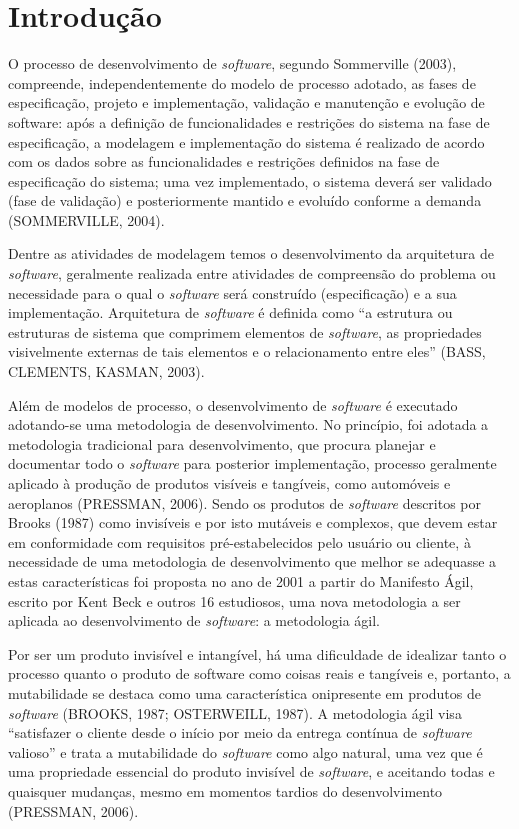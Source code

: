 \chapter[Introdução]{Introdução}

O processo de desenvolvimento de \textit{software}, segundo Sommerville (2003), compreende, independentemente do modelo de processo adotado, as fases de especificação, projeto e implementação, validação e manutenção e evolução de software: após a definição de funcionalidades e restrições do sistema na fase de especificação, a modelagem e implementação do sistema é realizado de acordo com os dados sobre as funcionalidades e restrições definidos na fase de especificação do sistema; uma vez implementado, o sistema deverá ser validado (fase de validação) e posteriormente mantido e evoluído conforme a demanda (SOMMERVILLE, 2004). 

Dentre as atividades de modelagem temos o desenvolvimento da arquitetura de \textit{software}, geralmente realizada entre atividades de compreensão do problema ou necessidade para o qual o \textit{software} será construído (especificação) e a sua implementação. Arquitetura de \textit{software} é definida como “a estrutura ou estruturas de sistema que comprimem elementos de \textit{software}, as propriedades visivelmente externas de tais elementos e o relacionamento entre eles” (BASS, CLEMENTS, KASMAN, 2003).

Além de modelos de processo, o desenvolvimento de \textit{software} é executado adotando-se uma metodologia de desenvolvimento. No princípio, foi adotada a metodologia tradicional para desenvolvimento, que procura planejar e documentar todo o \textit{software} para posterior implementação, processo geralmente aplicado à produção de produtos visíveis e tangíveis, como automóveis e aeroplanos (PRESSMAN, 2006). Sendo os produtos de \textit{software} descritos por Brooks (1987) como invisíveis e por isto mutáveis e complexos, que devem estar em conformidade com requisitos pré-estabelecidos pelo usuário ou cliente, à necessidade de uma metodologia de desenvolvimento que melhor se adequasse a estas características foi proposta no ano de 2001 a partir do Manifesto Ágil, escrito por Kent Beck e outros 16 estudiosos, uma nova metodologia a ser aplicada ao desenvolvimento de \textit{software}: a metodologia ágil.

Por ser um produto invisível e intangível, há uma dificuldade de idealizar tanto o processo quanto o produto de software como coisas reais e tangíveis e, portanto, a mutabilidade se destaca como uma característica onipresente em produtos de \textit{software} (BROOKS, 1987; OSTERWEILL, 1987). A metodologia ágil visa “satisfazer o cliente desde o início por meio da entrega contínua de \textit{software} valioso” e trata a mutabilidade do \textit{software} como algo natural, uma vez que é uma propriedade essencial do produto invisível de \textit{software}, e aceitando todas e quaisquer mudanças, mesmo em momentos tardios do desenvolvimento (PRESSMAN, 2006).

